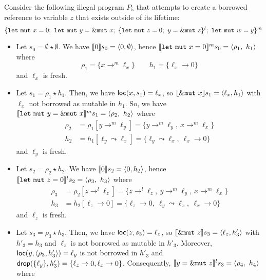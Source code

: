 \begin{example}
  Consider the following illegal program $P_5$ that attempts to create
  a borrowed reference to variable $z$ that exists outside of its lifetime:
  {\small
  \[
    \{
      \mathtt{let\ mut}\ x = 0;\
      \mathtt{let\ mut}\ y = \mutborrow x;\
      \{\mathtt{let\ mut}\ z = 0;\ y = \mutborrow z\}^l;\
      \mathtt{let\ mut}\ w = y
    \}^m
  \]}
  \begin{itemize}
    \item Let $s_0=\emptyset \star \emptyset$.
    We have $\den[0]{s_0} = \langle 0,\emptyset\rangle$, hence
    $\denl[\mathtt{let\ mut}\ x = 0]{m}{s_0} =
    \langle \rho_1,\ h_1\rangle$ where
    \[\rho_1=\{x\to^m\ell_x\} \qquad
    h_1 = \{\ell_x\to 0\}\]
    and $\ell_x$ is fresh.
    \item Let $s_1 = \rho_1 \star h_1$.
    Then, we have $\loc(x,s_1) = \ell_x$, so
    $\den[\mutborrow x]{s_1} = \langle\ell_x, h_1\rangle$
    with $\ell_x$ not borrowed as mutable in $h_1$.
    So, we have
    $\denl[\mathtt{let\ mut}\ y = \mutborrow x]{m}{s_1} =
    \langle \rho_2,\ h_2\rangle$
    where
    \begin{align*}
      \rho_2 & = \rho_1[y\to^m\ell_y] = \{y\to^m\ell_y,\ x\to^m\ell_x\}\\
      h_2 & = h_1[\ell_y\leadsto \ell_x] =
      \{\ell_y\leadsto \ell_x,\ \ell_x\to 0\}
    \end{align*}
    and $\ell_y$ is fresh.
    \item Let $s_2 = \rho_2 \star h_2$.
    We have $\den[0]{s_2} = \langle 0,h_2\rangle$, hence
    $\denl[\mathtt{let\ mut}\ z = 0]{l}{s_2} =
    \langle \rho_3,\ h_3\rangle$ where
    \begin{align*}
      \rho_3 & = \rho_2[z\to^l\ell_z] =
      \{z\to^l\ell_z,\ y\to^m\ell_y,\ x\to^m\ell_x\}\\
      h_3 & = h_2[\ell_z\to 0] =
      \{\ell_z\to 0,\ \ell_y\leadsto \ell_x,\ \ell_x\to 0\}
    \end{align*}
    and $\ell_z$ is fresh.
    \item Let $s_3 = \rho_3 \star h_3$.
    Then, we have $\loc(z,s_3) = \ell_z$, so
    $\den[\mutborrow z]{s_3} = \langle\ell_z, h'_3\rangle$
    with $h'_3=h_3$ and $\ell_z$ is not borrowed as mutable in $h'_3$.
    Moreover, $\loc(y,\langle \rho_3,h'_3\rangle) = \ell_y$ is not
    borrowed in $h'_3$
    and $\drop(\{\ell_y\},h'_3) =
    \{\ell_z\to 0,\ell_x\to 0\}$. Consequently,
    $\denl[y = \mutborrow z]{l}{s_3} = \langle \rho_4,\ h_4\rangle$
    where

\end{itemize}
\end{example}
